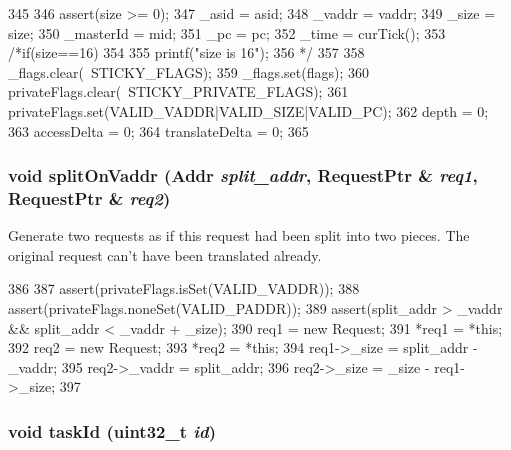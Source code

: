 \begin{DoxyCode}
345     {
346         assert(size >= 0);
347         _asid = asid;
348         _vaddr = vaddr;
349         _size = size;
350         _masterId = mid;
351         _pc = pc;
352         _time = curTick();
353         /*if(size==16)
354           {
355             printf("size is 16\n");
356             }*/
357 
358         _flags.clear(~STICKY_FLAGS);
359         _flags.set(flags);
360         privateFlags.clear(~STICKY_PRIVATE_FLAGS);
361         privateFlags.set(VALID_VADDR|VALID_SIZE|VALID_PC);
362         depth = 0;
363         accessDelta = 0;
364         translateDelta = 0;
365     }
\end{DoxyCode}
\hypertarget{classRequest_ae170370b8e735017a61a913b767f0d9d}{
\subsubsection[{splitOnVaddr}]{\setlength{\rightskip}{0pt plus 5cm}void splitOnVaddr ({\bf Addr} {\em split\_\-addr}, \/  {\bf RequestPtr} \& {\em req1}, \/  {\bf RequestPtr} \& {\em req2})}}
\label{classRequest_ae170370b8e735017a61a913b767f0d9d}
Generate two requests as if this request had been split into two pieces. The original request can't have been translated already. 


\begin{DoxyCode}
386     {
387         assert(privateFlags.isSet(VALID_VADDR));
388         assert(privateFlags.noneSet(VALID_PADDR));
389         assert(split_addr > _vaddr && split_addr < _vaddr + _size);
390         req1 = new Request;
391         *req1 = *this;
392         req2 = new Request;
393         *req2 = *this;
394         req1->_size = split_addr - _vaddr;
395         req2->_vaddr = split_addr;
396         req2->_size = _size - req1->_size;
397     }
\end{DoxyCode}
\hypertarget{classRequest_a5980a3ad18eeedbec785527bbab54317}{
\subsubsection[{taskId}]{\setlength{\rightskip}{0pt plus 5cm}void taskId ({\bf uint32\_\-t} {\em id})}}
\label{classRequest_a5980a3ad18eeedbec785527bbab54317}



